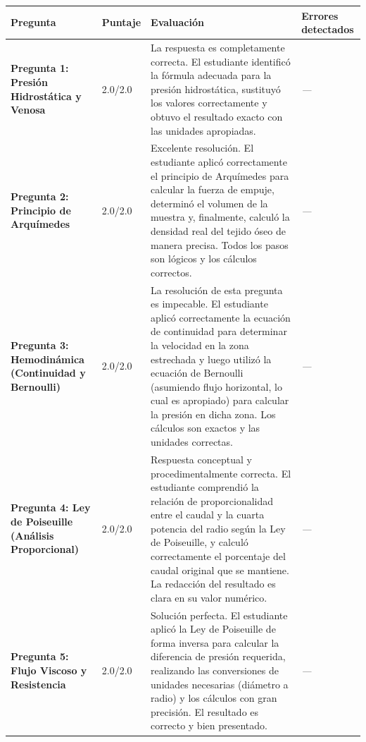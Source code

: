 \documentclass[11pt,a4paper]{article}
\begin{document}
\begin{longtable}{>{\bfseries}p{2.8cm} p{1.6cm} p{7.0cm} p{2.8cm}}
  \toprule
  \textbf{Pregunta} & \textbf{Puntaje} & \textbf{Evaluación} & \textbf{Errores detectados} \\
  \midrule
  \endhead
  \bottomrule
  \endfoot
    \textbf{Pregunta 1: Presión Hidrostática y Venosa} & 2.0/2.0 & La respuesta es completamente correcta. El estudiante identificó la fórmula adecuada para la presión hidrostática, sustituyó los valores correctamente y obtuvo el resultado exacto con las unidades apropiadas. & \textit{---} \\
    \midrule
    \textbf{Pregunta 2: Principio de Arquímedes} & 2.0/2.0 & Excelente resolución. El estudiante aplicó correctamente el principio de Arquímedes para calcular la fuerza de empuje, determinó el volumen de la muestra y, finalmente, calculó la densidad real del tejido óseo de manera precisa. Todos los pasos son lógicos y los cálculos correctos. & \textit{---} \\
    \midrule
    \textbf{Pregunta 3: Hemodinámica (Continuidad y Bernoulli)} & 2.0/2.0 & La resolución de esta pregunta es impecable. El estudiante aplicó correctamente la ecuación de continuidad para determinar la velocidad en la zona estrechada y luego utilizó la ecuación de Bernoulli (asumiendo flujo horizontal, lo cual es apropiado) para calcular la presión en dicha zona. Los cálculos son exactos y las unidades correctas. & \textit{---} \\
    \midrule
    \textbf{Pregunta 4: Ley de Poiseuille (Análisis Proporcional)} & 2.0/2.0 & Respuesta conceptual y procedimentalmente correcta. El estudiante comprendió la relación de proporcionalidad entre el caudal y la cuarta potencia del radio según la Ley de Poiseuille, y calculó correctamente el porcentaje del caudal original que se mantiene. La redacción del resultado es clara en su valor numérico. & \textit{---} \\
    \midrule
    \textbf{Pregunta 5: Flujo Viscoso y Resistencia} & 2.0/2.0 & Solución perfecta. El estudiante aplicó la Ley de Poiseuille de forma inversa para calcular la diferencia de presión requerida, realizando las conversiones de unidades necesarias (diámetro a radio) y los cálculos con gran precisión. El resultado es correcto y bien presentado. & \textit{---} \\
    \midrule
\end{longtable}

\end{document}
